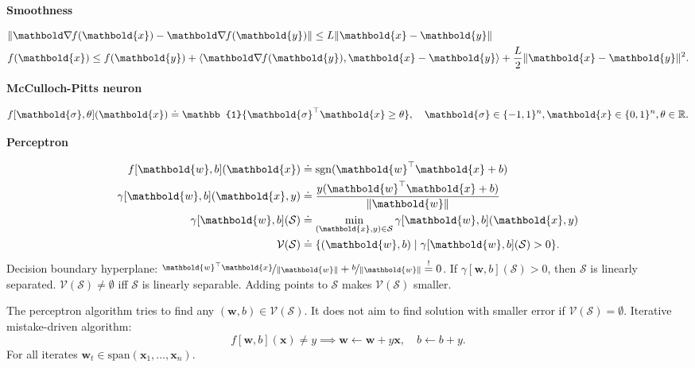 \documentclass[10pt]{article}
\newenvironment{topic}[1]
{\textbf{\sffamily \footnotesize \colorbox{black}{\rlap{\textbf{\textcolor{white}{#1}}}\hspace{\linewidth}\hspace{-2\fboxsep}}}}
{}
\newenvironment{subtopic}[1]
{\vspace{0.1cm} \begin{center}\textbf{\footnotesize \sffamily #1}\end{center}}
{}
\renewcommand{\vec}[1]{\ensuremath{\mathbold{#1}}}
\begin{document}
\begin{multicols*}{3}
    \begin{subtopic}{Smoothness}
        \begin{align*}
            & \| \grad{f(\vec{x})}{} - \grad{f(\vec{y})}{} \| \leq L \| \vec{x} - \vec{y} \|                                                 \\
            & f(\vec{x}) \leq f(\vec{y}) + \langle \grad{f(\vec{y})}{}, \vec{x} - \vec{y} \rangle + \frac{L}{2} \| \vec{x} - \vec{y} \|^2.
        \end{align*}
    \end{subtopic}

    \begin{topic}{Connectionism}

        \begin{subtopic}{McCulloch-Pitts neuron}
            \[
                f[\vec{\sigma},\theta](\vec{x}) \doteq \mathbb{1}\{ \transpose{\vec{\sigma}}\vec{x} \geq \theta \}, \quad \vec{\sigma} \in \{ -1,1 \}^n, \vec{x} \in \{ 0,1 \}^n, \theta \in \R.
            \]
        \end{subtopic}

        \begin{subtopic}{Perceptron}
            \begin{align*}
                f[\vec{w},b](\vec{x})          & \doteq \mathrm{sgn}(\transpose{\vec{w}}\vec{x} + b)                    \\
                \gamma[\vec{w},b](\vec{x},y)   & \doteq \frac{y (\transpose{\vec{w}}\vec{x} + b)}{\| \vec{w} \|}        \\
                \gamma[\vec{w},b](\mathcal{S}) & \doteq \min_{(\vec{x},y) \in \mathcal{S}} \gamma[\vec{w},b](\vec{x},y) \\
                \mathcal{V}(\mathcal{S})       & \doteq \{ (\vec{w},b) \mid \gamma[\vec{w},b](\mathcal{S}) > 0 \}.
            \end{align*}
            Decision boundary hyperplane: $\nicefrac{\transpose{\vec{w}} \vec{x}}{\| \vec{w} \|} + \nicefrac{b}{\| \vec{w} \|}
                \overset{!}{=} 0$. If $\gamma[\vec{w},b](\mathcal{S}) > 0$, then $\mathcal{S}$ is
            linearly separated. $\mathcal{V}(\mathcal{S}) \neq \emptyset$ iff $\mathcal{S}$ is
            linearly separable. Adding points to $\mathcal{S}$ makes $\mathcal{V}(\mathcal{S})$ smaller.

            The perceptron algorithm tries to find any $(\vec{w},b) \in \mathcal{V}(\mathcal{S})$. It does not
            aim to find solution with smaller error if $\mathcal{V}(\mathcal{S}) = \emptyset$. Iterative
            mistake-driven algorithm: \[
                f[\vec{w},b](\vec{x}) \neq y \implies \vec{w} \gets \vec{w} + y \vec{x}, \quad b \gets b + y.
            \]
            For all iterates $\vec{w}_t \in \mathrm{span}(\vec{x}_1, \ldots, \vec{x}_n)$.


\end{subtopic}
\end{topic}
\end{multicols*}
\end{document}
